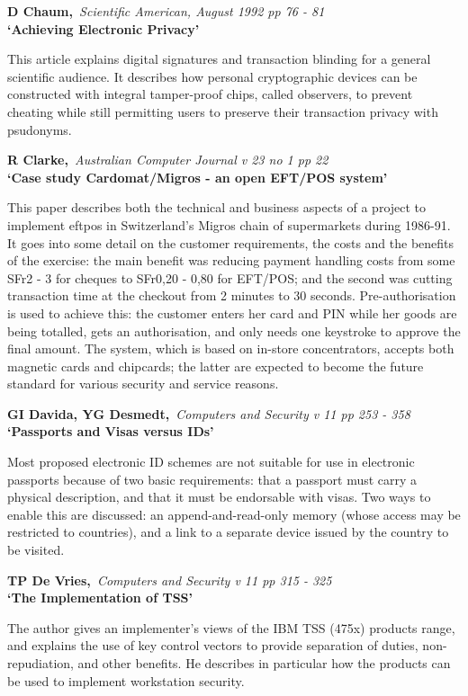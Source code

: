 {\bf \noindent D Chaum,}{\em ~Scientific American, August 1992 pp 76 - 81\\}
{\bf `Achieving Electronic Privacy'}

This article explains digital signatures and transaction blinding for a
general scientific audience. It describes how personal cryptographic devices
can be constructed with integral tamper-proof chips, called observers, to 
prevent cheating while still permitting users to preserve their transaction
privacy with psudonyms.

{\bf \noindent R Clarke,}{\em ~Australian Computer Journal v 23 no 1 pp 22\\}
{\bf `Case study Cardomat/Migros - an open EFT/POS system'}

This paper describes both the technical and business aspects of a project to
implement eftpos in Switzerland's Migros chain of supermarkets during 
1986-91. It goes into some detail on the customer requirements, the costs 
and the benefits of the exercise: the main benefit was reducing payment 
handling costs from some SFr2 - 3 for cheques to SFr0,20 - 0,80 for EFT/POS; 
and the second was cutting transaction time at the checkout from 2 minutes to 
30 seconds. Pre-authorisation is used to achieve this: the customer enters 
her card and PIN while her goods are being totalled, gets an authorisation, 
and only needs one keystroke to approve the final amount. The system, which 
is based on in-store concentrators, accepts both magnetic cards and 
chipcards; the latter are expected to become the future standard for various 
security and service reasons.

{\bf \noindent GI Davida, YG Desmedt,}{\em ~Computers and Security v 11 pp
253 - 358\\}
{\bf `Passports and Visas versus IDs'}

Most proposed electronic ID schemes are not suitable for use in electronic
passports because of two basic requirements: that a passport must carry a
physical description, and that it must be endorsable with visas. Two ways
to enable this are discussed: an append-and-read-only memory (whose access
may be restricted to countries), and a link to a separate device issued by
the country to be visited.

\pagebreak

{\bf \noindent TP De Vries,}{\em ~Computers and Security v 11 pp 315 - 325\\}
{\bf `The Implementation of TSS'}

The author gives an implementer's views of the IBM TSS (475x) products range,
and explains the use of key control vectors to provide separation of
duties, non-repudiation, and other benefits. He describes in particular how
the products can be used to implement workstation security.

